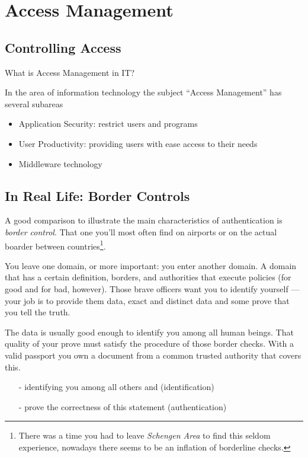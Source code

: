 
\section{Access Management}

\subsection{Controlling Access}

What is Access Management in IT\@?

In the area of information technology the subject ``Access Management'' 
has several subareas

\begin{itemize}
    \item Application Security: restrict users and programs
    \item User Productivity: providing users with ease access to their needs
    \item Middleware technology
\end{itemize}



\subsection{In Real Life: Border Controls}

A good comparison to illustrate the main characteristics of
authentication is \emph{border control}. That one you'll most often find
on airports or on the actual boarder between countries\footnote{There
was a time you had to leave \emph{Schengen Area} to find this seldom
experience, nowadays there seems to be an inflation of borderline
checks.}.

You leave one domain, or more important: you enter another domain. 
A domain that has a certain definition, borders, and authorities that 
execute policies (for good and for bad, however).  Those brave officers 
want you to identify yourself --- your job is to provide them data, exact 
and distinct data and some prove that you tell the truth.

The data is usually good enough to identify you among all human beings.
That quality of your prove must satisfy the procedure of those border
checks. With a valid passport you own a document from a common trusted
authority that covers this.

\begin{enumerate}
    \item[-] identifying you among all others and (identification)
    \item[-] prove the correctness of this statement (authentication)
\end{enumerate}

